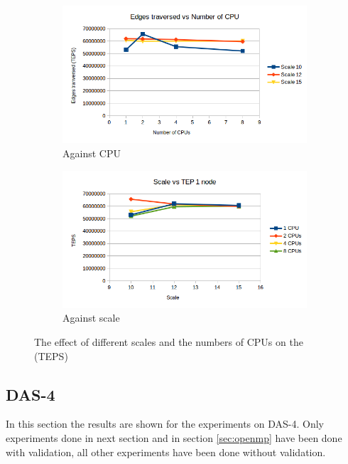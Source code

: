\begin{figure}[!h]
\centering
\begin{subfigure}{.5\textwidth}
  \centering
  \includegraphics[width=\linewidth]{images/openmp_cpus.png}
  \caption{Against CPU}
  \label{fig:openmp_cpu}
\end{subfigure}%
\begin{subfigure}{.5\textwidth}
  \centering
  \includegraphics[width=\linewidth]{images/openmp_scale.png}
  \caption{Against scale}
  \label{fig:openmp_scale}
\end{subfigure}
\caption{The effect of different scales and the numbers of CPUs on the (TEPS)}
\label{fig:openmp_scale_cpu}
\end{figure}

\subsection{DAS-4}
In this section the results are shown for the experiments on DAS-4. Only experiments done in next section and in section \ref{sec:openmp} have been done with validation, all other experiments have been done without validation.

